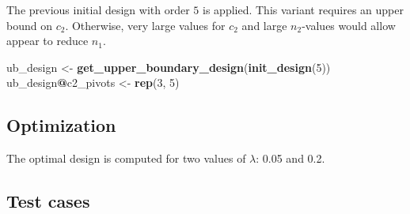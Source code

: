 \documentclass[]{book}
\newenvironment{Shaded}{\begin{snugshade}}{\end{snugshade}}
\newcommand{\DataTypeTok}[1]{\textcolor[rgb]{0.13,0.29,0.53}{#1}}
\newcommand{\DecValTok}[1]{\textcolor[rgb]{0.00,0.00,0.81}{#1}}
\newcommand{\FloatTok}[1]{\textcolor[rgb]{0.00,0.00,0.81}{#1}}
\newcommand{\KeywordTok}[1]{\textcolor[rgb]{0.13,0.29,0.53}{\textbf{#1}}}
\newcommand{\NormalTok}[1]{#1}
\newcommand{\OperatorTok}[1]{\textcolor[rgb]{0.81,0.36,0.00}{\textbf{#1}}}
\newcommand{\StringTok}[1]{\textcolor[rgb]{0.31,0.60,0.02}{#1}}
\begin{document}
The previous initial design with order \(5\) is applied.
This variant requires an upper bound on \(c_2\).
Otherwise, very large values for \(c_2\) and large \(n_2\)-values would allow
appear to reduce \(n_1\).

\begin{Shaded}
\begin{Highlighting}[]
\NormalTok{ub_design <-}\StringTok{ }\KeywordTok{get_upper_boundary_design}\NormalTok{(}\KeywordTok{init_design}\NormalTok{(}\DecValTok{5}\NormalTok{))}
\NormalTok{ub_design}\OperatorTok{@}\NormalTok{c2_pivots <-}\StringTok{ }\KeywordTok{rep}\NormalTok{(}\DecValTok{3}\NormalTok{, }\DecValTok{5}\NormalTok{)}
\end{Highlighting}
\end{Shaded}

\hypertarget{optimization-11}{%
\subsection{Optimization}\label{optimization-11}}

The optimal design is computed for two values of \(\lambda\): 0.05 and 0.2.

\begin{Shaded}
\end{Shaded}

\hypertarget{test-cases-12}{%
\subsection{Test cases}\label{test-cases-12}}
\end{document}
